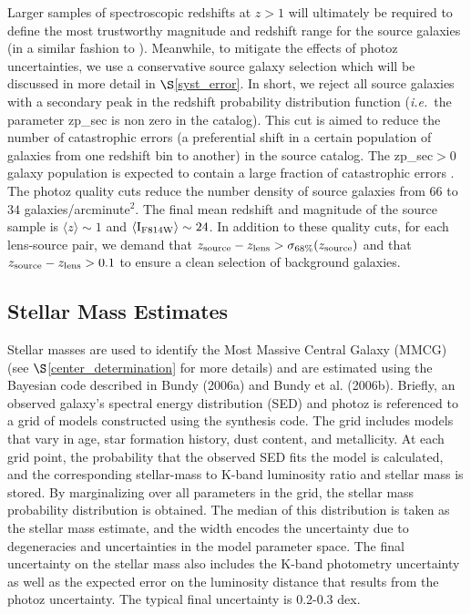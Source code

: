 \documentclass[12pt]{emulateapj}
\newcommand{\ie}{{\it i.e.}}
\begin{document}
Larger samples of spectroscopic redshifts at $z>1$ will ultimately be
required to define the most trustworthy magnitude and redshift range
for the source galaxies (in a similar fashion to
\citet{Mandelbaum:2008}). Meanwhile, to mitigate the effects of photoz
uncertainties, we use a conservative source galaxy selection which
will be discussed in more detail in $\S$\ref{syst_error}. In short, we
reject all source galaxies with a secondary peak in the redshift
probability distribution function (\ie\ the parameter {\sc zp\_sec} is
non zero in the \citet{Ilbert:2009} catalog). This cut is aimed to
reduce the number of catastrophic errors (a preferential shift in a
certain population of galaxies from one redshift bin to another) in
the source catalog. The {\sc zp\_sec$>0$} galaxy population is
expected to contain a large fraction of catastrophic errors
\citep[roughly 40\%-50\%,][]{Ilbert:2006,Ilbert:2009}. The photoz
quality cuts reduce the number density of source galaxies from $66$ to
$34$ galaxies/arcminute$^{2}$. The final mean redshift and magnitude
of the source sample is $\langle z \rangle \sim 1$ and $\langle
\rm{I}_{F814W} \rangle \sim 24$. In addition to these quality cuts,
for each lens-source pair, we demand that $z_{\rm source}-z_{\rm
  lens}> \sigma_{68\%}(z_{\rm source})$ and that $z_{\rm
  source}-z_{\rm lens}> 0.1$ to ensure a clean selection of background
galaxies.

\subsection{Stellar Mass Estimates}\label{stellar_masses}

Stellar masses are used to identify the Most Massive Central Galaxy
(MMCG) (see $\S$\ref{center_determination} for more details) and are
estimated using the Bayesian code described in Bundy (2006a) and Bundy
et al. (2006b). Briefly, an observed galaxy's spectral energy
distribution (SED) and photoz is referenced to a grid of models
constructed using the \citet{bruzual:2003} synthesis code.  The grid
includes models that vary in age, star formation history, dust
content, and metallicity.  At each grid point, the probability that
the observed SED fits the model is calculated, and the corresponding
stellar-mass to K-band luminosity ratio and stellar mass is stored.
By marginalizing over all parameters in the grid, the stellar mass
probability distribution is obtained.  The median of this distribution
is taken as the stellar mass estimate, and the width encodes the
uncertainty due to degeneracies and uncertainties in the model
parameter space.  The final uncertainty on the stellar mass also
includes the K-band photometry uncertainty as well as the expected
error on the luminosity distance that results from the photoz
uncertainty.  The typical final uncertainty is 0.2-0.3 dex.
\end{document}
